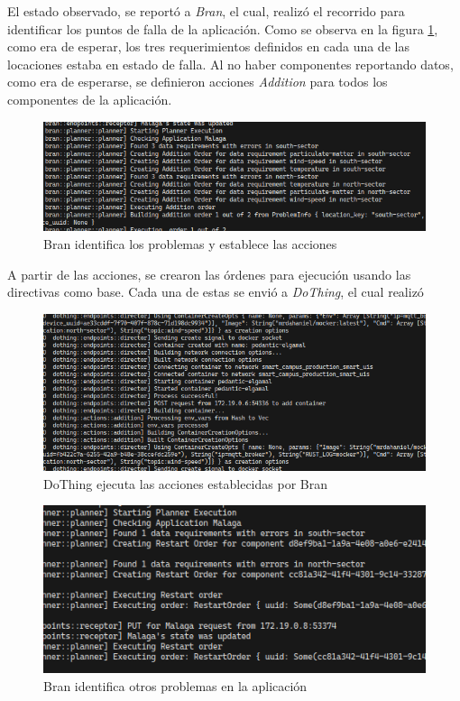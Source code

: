 El estado observado, se reportó a \textit{Bran}, el cual, realizó el recorrido para identificar los puntos de falla de la aplicación. Como se observa en la figura \ref{fig:BranPlan}, como era de esperar, los tres requerimientos definidos en cada una de las locaciones estaba en estado de falla. Al no haber componentes reportando datos, como era de esperarse, se definieron acciones \textit{Addition} para todos los componentes de la aplicación. 

\begin{figure}[H]
    \centering
    \caption{Bran identifica los problemas y establece las acciones}
    \label{fig:BranPlan}
    \includegraphics[width=\linewidth]{images/BranPlanning.png}
    \vspace{-4mm}
\end{figure}

A partir de las acciones, se crearon las órdenes para ejecución usando las directivas como base. Cada una de estas se envió a \textit{DoThing}, el cual realizó 

\begin{figure}[H]
    \centering
    \caption{DoThing ejecuta las acciones establecidas por Bran }
    \label{fig:DoThingDoing}
    \includegraphics[width=\linewidth]{images/DoThingDoing.png}
    \vspace{-4mm}
\end{figure}

\begin{figure}[H]
    \centering
    \caption{Bran identifica otros problemas en la aplicación}
    \label{fig:BranPlan2}
    \includegraphics[width=\linewidth]{images/BranRestarting.png}
    \vspace{-4mm}
\end{figure}

